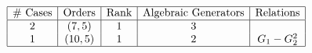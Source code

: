 \begin{table}[h]
	\centering
	$\begin{array}{|c|c|c|c|c|}
		\hline
		\text{\# Cases} & \text{Orders} & \text{Rank} & \text{Algebraic Generators} & \text{Relations} \\
		\hline
		2 & (7, 5) & 1 & 3 &  \\
		1 & (10, 5) & 1 & 2 & G_1 - G_2^2 \\
		\hline
	\end{array}$
\end{table}
